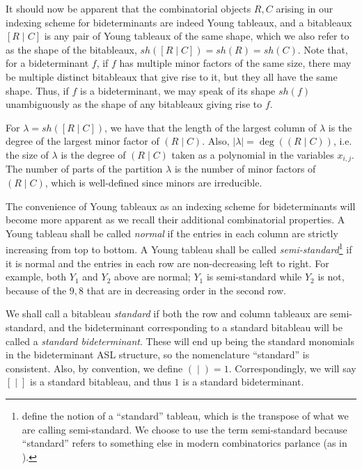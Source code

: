 \documentclass[11pt,reqno]{amsart}
\newcommand{\bitab}[2]{[#1\;|\;#2]}
\newcommand{\bidet}[2]{(#1\;|\;#2)}
\newcommand{\shapebitab}{sh}
\newcommand{\shapetab}[1]{sh(#1)}
\theoremstyle{definition}
\numberwithin{equation}{section}
\begin{document}
It should now be apparent that the combinatorial objects $R,C$ arising in our indexing scheme for bideterminants are indeed Young tableaux, and a bitableaux $\bitab{R}{C}$ is any pair of Young tableaux of the same shape, which we also refer to as the shape of the bitableaux, $\shapebitab(\bitab{R}{C}) = \shapetab{R} = \shapetab{C}$. Note that, for a bideterminant $f$, if $f$ has multiple minor factors of the same size, there may be multiple distinct bitableaux that give rise to it, but they all have the same shape. Thus, if $f$ is a bideterminant, we may speak of its shape $\shapetab{f}$ unambiguously as the shape of any bitableaux giving rise to $f$.

For $\lambda = \shapebitab(\bitab{R}{C})$, we have that the length of the largest column of $\lambda$ is the degree of the largest minor factor of $\bidet{R}{C}$. Also, $|\lambda| = \deg(\bidet{R}{C})$, i.e. the size of $\lambda$ is the degree of $\bidet{R}{C}$ taken as a polynomial in the variables $x_{i,j}$. The number of parts of the partition $\lambda$ is the number of minor factors of $\bidet{R}{C}$, which is well-defined since minors are irreducible.

The convenience of Young tableaux as an indexing scheme for bideterminants will become more apparent as we recall their additional combinatorial properties. A Young tableau shall be called \hypertarget{def:normal}{\emph{normal}} if the entries in each column are strictly increasing from top to bottom. A Young tableau shall be called \emph{semi-standard}\footnote{\cite{desarmenien1982invariant} define the notion of a ``standard'' tableau, which is the transpose of what we are calling semi-standard. We choose to use the term semi-standard because ``standard'' refers to something else in modern combinatorics parlance (as in \cite{grinberginvariant}).} if it is normal and the entries in each row are non-decreasing left to right. For example, both $Y_1$ and $Y_2$ above are normal; $Y_1$ is semi-standard while $Y_2$ is not, because of the $9,8$ that are in decreasing order in the second row.

We shall call a bitableau \emph{standard} if both the row and column tableaux are semi-standard, and the bideterminant corresponding to a standard bitableau will be called a \emph{standard bideterminant}. These will end up being the standard monomials in the bideterminant ASL structure, so the nomenclature ``standard'' is consistent. 
Also, by convention, we define $\bidet{}{} = 1$. Correspondingly, we will say $\bitab{}{}$ is a standard bitableau, and thus $1$ is a standard bideterminant.
\end{document}
